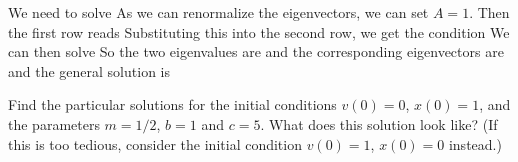 \solution 
We need to solve 
As we can renormalize the eigenvectors, we can set $A=1$. Then the first row reads 
Substituting this into the second row, we get the condition 
We can then solve 
So the two eigenvalues are 
and the corresponding eigenvectors are 
and the general solution is 

\subquestion 
Find the particular solutions for the initial conditions $v(0)=0$, $x(0)=1$,
and the parameters $m=1/2$, $b=1$ and $c=5$. What does this solution look like? (If this is too tedious, consider the initial condition $v(0)=1$, $x(0)=0$ instead.)

